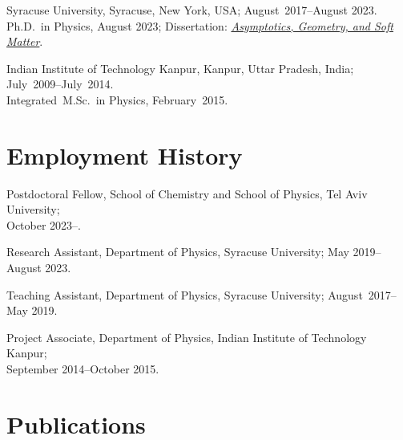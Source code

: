 \documentclass[10pt,a4paper,article,oneside]{memoir}
\def\bname{\underline{Manu Mannattil}}    %
\begin{document}
Syracuse University, Syracuse, New York, USA; August~2017--August 2023.\\
Ph.D.~in Physics, August 2023; Dissertation: \emph{\href{https://raw.githubusercontent.com/manu-mannattil/thesis/build/thesis.pdf}{Asymptotics, Geometry, and Soft Matter}}.

Indian Institute of Technology Kanpur, Kanpur, Uttar Pradesh, India; July~2009--July~2014.\\
Integrated~M.Sc.~in Physics, February~2015.




\section{Employment History}

Postdoctoral Fellow, School of Chemistry and School of Physics, Tel Aviv University;\\ October 2023--.

Research Assistant, Department of Physics, Syracuse University; May 2019--August 2023.

Teaching Assistant, Department of Physics, Syracuse University; August~2017--May 2019.

Project Associate, Department of Physics, Indian Institute of Technology Kanpur;\\ September 2014--October 2015.


\section{Publications}


\end{document}
